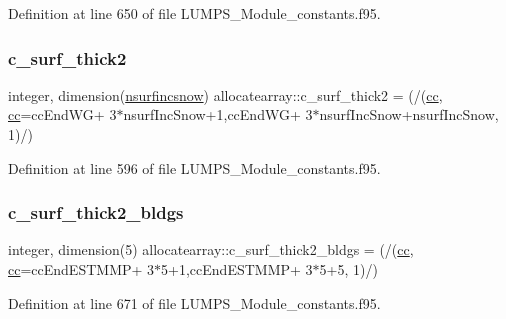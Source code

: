 Definition at line 650 of file L\+U\+M\+P\+S\+\_\+\+Module\+\_\+constants.\+f95.

\mbox{\label{namespaceallocatearray_ab0c34bdf07a4bcc153b9821464d45a3e}} 
\subsubsection{\texorpdfstring{c\+\_\+surf\+\_\+thick2}{c\_surf\_thick2}}
{\footnotesize\ttfamily integer, dimension(\hyperlink{namespaceallocatearray_af4d113f332b6759cfa22271140c9162d}{nsurfincsnow}) allocatearray\+::c\+\_\+surf\+\_\+thick2 = (/(\hyperlink{namespaceallocatearray_ac863c81704eb507dee10f5e10741e10c}{cc}, \hyperlink{namespaceallocatearray_ac863c81704eb507dee10f5e10741e10c}{cc}=cc\+End\+WG+ 3$\ast$nsurf\+Inc\+Snow+1,cc\+End\+WG+ 3$\ast$nsurf\+Inc\+Snow+nsurf\+Inc\+Snow, 1)/)}



Definition at line 596 of file L\+U\+M\+P\+S\+\_\+\+Module\+\_\+constants.\+f95.

\mbox{\label{namespaceallocatearray_a4d869e9f6bbea24bd21da74dc1adc704}} 
\subsubsection{\texorpdfstring{c\+\_\+surf\+\_\+thick2\+\_\+bldgs}{c\_surf\_thick2\_bldgs}}
{\footnotesize\ttfamily integer, dimension(5) allocatearray\+::c\+\_\+surf\+\_\+thick2\+\_\+bldgs = (/(\hyperlink{namespaceallocatearray_ac863c81704eb507dee10f5e10741e10c}{cc}, \hyperlink{namespaceallocatearray_ac863c81704eb507dee10f5e10741e10c}{cc}=cc\+End\+E\+S\+T\+M\+MP+ 3$\ast$5+1,cc\+End\+E\+S\+T\+M\+MP+ 3$\ast$5+5, 1)/)}



Definition at line 671 of file L\+U\+M\+P\+S\+\_\+\+Module\+\_\+constants.\+f95.

\mbox{\label{namespaceallocatearray_ac2c0390dbe3932c5ec8dfd22768a7e13}} 
